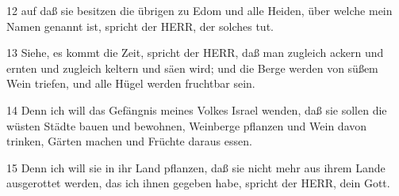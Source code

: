 \par 12 auf daß sie besitzen die übrigen zu Edom und alle Heiden, über welche mein Namen genannt ist, spricht der HERR, der solches tut.
\par 13 Siehe, es kommt die Zeit, spricht der HERR, daß man zugleich ackern und ernten und zugleich keltern und säen wird; und die Berge werden von süßem Wein triefen, und alle Hügel werden fruchtbar sein.
\par 14 Denn ich will das Gefängnis meines Volkes Israel wenden, daß sie sollen die wüsten Städte bauen und bewohnen, Weinberge pflanzen und Wein davon trinken, Gärten machen und Früchte daraus essen.
\par 15 Denn ich will sie in ihr Land pflanzen, daß sie nicht mehr aus ihrem Lande ausgerottet werden, das ich ihnen gegeben habe, spricht der HERR, dein Gott.

